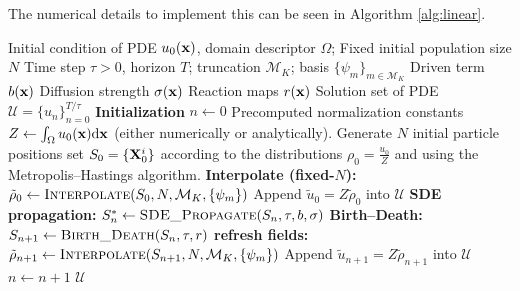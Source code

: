 \documentclass[preprint,12pt]{elsarticle}
\theoremstyle{definition}
\theoremstyle{remark}
\begin{document}
The numerical details to implement this can be seen in Algorithm \ref{alg:linear}.
\begin{algorithm}
    \caption{Stochastic Branching for linear scalar reaction--diffusion--advection equation} \label{alg:linear}
    \begin{algorithmic}
        \Require Initial condition of PDE $u_0(\mathbf{x})$, domain descriptor $\Omega$;
        \Require Fixed initial population size $N$
        \Require Time step $\tau>0$, horizon $T$; truncation $\mathcal M_K$; basis $\{\psi_m\}_{m\in\mathcal M_K}$
        \Require Driven term $b(\mathbf{x})$
        \Require Diffusion strength $\sigma(\mathbf{x})$
        \Require Reaction maps $r(\mathbf{x})$
        \Ensure  Solution set of PDE $\mathcal U = \{u_n\}_{n=0}^{T/\tau}$
        \State \textbf{Initialization}
        \State $n\gets 0$
        \State Precomputed normalization constants  $Z\gets \int_\Omega u_0(\mathbf{x})\mathrm{d} \mathbf{x}$  (either numerically or analytically).
        \State Generate $N$ initial particle positions set $S_0=\{\mathbf{X}^i_0\}$ according to the distributions $\rho_0=\frac{u_0}{Z}$ and using the Metropolis--Hastings algorithm.
        \State \textbf{Interpolate (fixed-$N$):}
        \State $\tilde\rho_0 \gets \textsc{Interpolate}(S_0,N,\mathcal M_K,\{\psi_m\})$
        \State Append $\tilde u_0 = Z\tilde \rho_0$ into $\mathcal U$
            \State \textbf{SDE propagation:}
            \State $S_n^*\gets \textsc{SDE\_Propagate}(S_n,\tau,b,\sigma)$
            \State \textbf{Birth--Death:}
            \State $S_{n+1}\gets \textsc{Birth\_Death}(S_{n},\tau,r)$
            \State \textbf{refresh fields:}
            \State $\tilde\rho_{n+1} \gets \textsc{Interpolate}(S_{n+1},N,\mathcal M_K,\{\psi_m\})$
            \State Append $\tilde u_{n+1} = Z\tilde \rho_{n+1}$ into $\mathcal U$
            \State $n\gets n+1$
        \EndWhile
        \State \Return $\mathcal U$
        \EndProcedure
    \end{algorithmic}
\end{algorithm}
\end{document}
